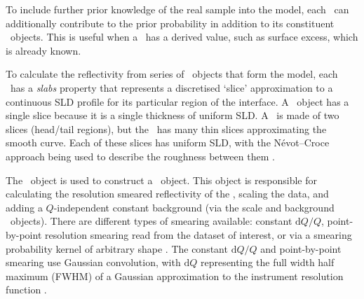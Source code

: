 \documentclass[pdf,preprint]{article}
\begin{document}
To include further prior knowledge of the real sample into the model,
each \Component\ can additionally contribute to the prior probability in addition to its constituent \Parameter\ objects. This is useful when a \Component\ has a derived value, such as surface excess, which is already known.

To calculate the reflectivity from series of \Component\ objects that form the model,
each \Component\ has a \emph{slabs} property that represents a discretised `slice' approximation to a continuous SLD profile for its particular region of the interface. A \Slab\ object has a single slice because it is a single thickness of uniform SLD. A \LipidLeaflet\ is made of two slices (head/tail regions), but the \Spline\ has many thin slices approximating the smooth curve. Each of these slices has uniform SLD, with the N\'{e}vot--Croce approach being used to describe the roughness between them \cite{Nevot1980}.

The \Structure\ object is used to construct a \ReflectModel\ object. This object is responsible for calculating the resolution smeared reflectivity of the \Structure, scaling the data, and adding a $Q$-independent constant background (via the scale and background \Parameter\ objects). There are different types of smearing available: constant $\mathrm{d}Q/Q$, point-by-point resolution smearing read from the dataset of interest, or via a smearing probability kernel of arbitrary shape \cite{Nelson2014}. The constant $\mathrm{d}Q/Q$ and point-by-point smearing use Gaussian convolution, with $\mathrm{d}Q$ representing the full width half maximum (FWHM) of a Gaussian approximation to the instrument resolution function \cite{Well2005}.
\end{document}
